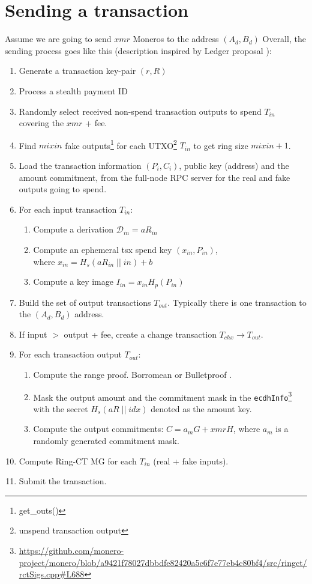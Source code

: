 \documentclass[]{article}
\begin{document}
\section{Sending a transaction}
Assume we are going to send $xmr$ Moneros to the address $(A_d, B_d)$
Overall, the sending process goes like this (description inspired by Ledger proposal \cite{ledger_doc}):

\begin{enumerate}
	\item Generate a transaction key-pair $(r, R)$
	\item Process a stealth payment ID
	\item Randomly select received non-spend transaction outputs to spend $T_{in}$ covering the $xmr$ + fee.
	\item Find $mixin$ fake outputs\footnote{get\_outs()} for each UTXO\footnote{unspend transaction output} $T_{in}$ to get ring size $mixin + 1$.
	\item Load the transaction information $(P_i, C_i)$, public key (address) and the amount commitment, from the full-node RPC server for the real and fake outputs going to spend.
	\item For each input transaction $T_{in}$:
	\begin{enumerate}
		\item Compute a derivation $\mathcal{D}_{in} = aR_{in}$
		\item Compute an ephemeral tsx spend key $(x_{in}, P_{in})$, \\where $x_{in} = H_s(aR_{in} \; || \; in) + b$
		\item Compute a key image $I_{in} = x_{in}H_p(P_{in})$
	\end{enumerate}
	\item Build the set of output transactions $T_{out}$. Typically there is one transaction to the $(A_d, B_d)$ address.
	\item If input $>$ output + fee, create a change transaction $T_{chx} \rightarrow T_{out}$. 
	\item For each transaction output $T_{out}$:
	\begin{enumerate}
		\item Compute the range proof. Borromean or Bulletproof \cite{monero_1098, borromean, Bnz2017BulletproofsSP}.
		\item Mask the output amount and the commitment mask in the \verb|ecdhInfo|\footnote{\url{https://github.com/monero-project/monero/blob/a9421f78027dbbdfe82420a5c6f7e77eb4c80bf4/src/ringct/rctSigs.cpp\#L688}} with the secret $H_s(aR\; || \; idx)$ denoted as the amount key.
		\item Compute the output commitments: $C = a_mG + xmrH$, where $a_m$ is a randomly generated commitment mask.
	\end{enumerate}
	\item Compute Ring-CT MG for each $T_{in}$ (real + fake inputs).
	\item Submit the transaction.
\end{enumerate}
\end{document}

